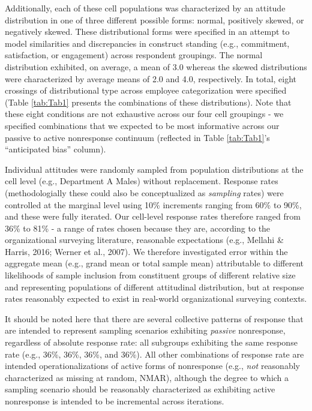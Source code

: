 \documentclass[
  man,floatsintext]{apa7}
\begin{document}
Additionally, each of these cell populations was characterized by an attitude distribution in one of three different possible forms: normal, positively skewed, or negatively skewed. These distributional forms were specified in an attempt to model similarities and discrepancies in construct standing (e.g., commitment, satisfaction, or engagement) across respondent groupings. The normal distribution exhibited, on average, a mean of 3.0 whereas the skewed distributions were characterized by average means of 2.0 and 4.0, respectively. In total, eight crossings of distributional type across employee categorization were specified (Table \ref{tab:Tab1} presents the combinations of these distributions). Note that these eight conditions are not exhaustive across our four cell groupings - we specified combinations that we expected to be most informative across our passive to active nonresponse continuum (reflected in Table \ref{tab:Tab1}'s ``anticipated bias'' column).

Individual attitudes were randomly sampled from population distributions at the cell level (e.g., Department A Males) without replacement. Response rates (methodologially these could also be conceptualized as \emph{sampling} rates) were controlled at the marginal level using 10\% increments ranging from 60\% to 90\%, and these were fully iterated. Our cell-level response rates therefore ranged from 36\% to 81\% - a range of rates chosen because they are, according to the organizational surveying literature, reasonable expectations (e.g., Mellahi \& Harris, 2016; Werner et al., 2007). We therefore investigated error within the aggregate mean (e.g., grand mean or total sample mean) attributable to different likelihoods of sample inclusion from constituent groups of different relative size and representing populations of different attitudinal distribution, but at response rates reasonably expected to exist in real-world organizational surveying contexts.

It should be noted here that there are several collective patterns of response that are intended to represent sampling scenarios exhibiting \emph{passive} nonresponse, regardless of absolute response rate: all subgroups exhibiting the same response rate (e.g., 36\%, 36\%, 36\%, and 36\%). All other combinations of response rate are intended operationalizations of active forms of nonresponse (e.g., \emph{not} reasonably characterized as missing at random, NMAR), although the degree to which a sampling scenario should be reasonably characterized as exhibiting active nonresponse is intended to be incremental across iterations.
\end{document}
